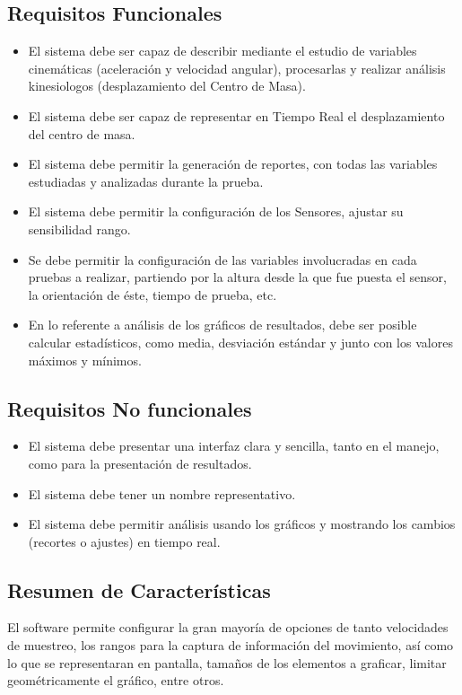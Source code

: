 \documentclass[12pt,a4paper]{article}
\begin{document}
\subsection{Requisitos Funcionales}
\begin{itemize}
	\item El sistema debe ser capaz de describir mediante el estudio de variables cinemáticas (aceleración y velocidad angular), procesarlas y realizar análisis kinesiologos (desplazamiento del Centro de Masa).
	\item El sistema debe ser capaz de representar en Tiempo Real el desplazamiento del centro de masa.
	\item El sistema debe permitir la generación de reportes, con todas las variables estudiadas y analizadas durante la prueba.
	\item El sistema debe permitir la configuración de los Sensores, ajustar su sensibilidad rango.
	\item Se debe permitir la configuración de las variables involucradas en cada pruebas a realizar, partiendo por la altura desde la que fue puesta el sensor, la orientación de éste, tiempo de prueba, etc.
	\item En lo referente a análisis de los gráficos de resultados, debe ser posible calcular estadísticos, como media, desviación estándar y junto con los valores máximos y mínimos.
\end{itemize} 

\subsection{Requisitos No funcionales}
\begin{itemize}
	\item El sistema debe presentar una interfaz clara y sencilla, tanto en el manejo, como para la presentación de resultados.
	\item El sistema debe tener un nombre representativo.
	\item El sistema debe permitir análisis usando los gráficos y mostrando los cambios (recortes o ajustes) en tiempo real.
\end{itemize}

\subsection{Resumen de Características}
El software permite configurar la gran mayoría de opciones de tanto velocidades de muestreo, los rangos para la captura de información del movimiento, así como lo que se representaran en pantalla, tamaños de los elementos a graficar, limitar geométricamente el gráfico, entre otros.
\end{document}
